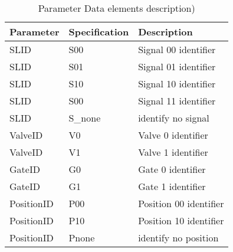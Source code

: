 \begin{table}[htbp]
	\centering
	\begin{tabular}{lp{6cm}l}
		\toprule
		\textbf{Parameter} & \textbf{Specification} & \textbf{Description} \\
		\hline
		SLID & S00 &  Signal 00 identifier\\
		SLID & S01 &  Signal 01 identifier\\
		SLID  & S10 &  Signal 10 identifier\\
		SLID  & S00 &  Signal 11 identifier\\
		SLID    & S\_none &  identify no signal\\
		ValveID & V0 &  Valve 0 identifier\\
		ValveID & V1 &  Valve 1 identifier\\
		GateID & G0 &  Gate 0 identifier\\
		GateID & G1 &  Gate 1 identifier\\
		PositionID & P00 &  Position 00 identifier\\
		PositionID & P10 &  Position 10 identifier\\
		PositionID   & Pnone &  identify no position\\
		\bottomrule
	\end{tabular}%
	\caption{Parameter Data elements description)}
	\label{tab:addlabel}%
\end{table}%




